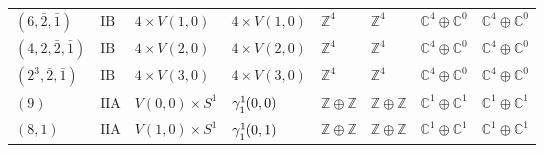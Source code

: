 \documentclass[11pt,a4paper]{article}
\def\unitbundle#1#2#3{{\gamma^1\!\!\!\strut_{#1}(#2,#3)}}
\begin{document}
\begin{appendix}
\begin{table}
\begin{tabular}{C{2.65cm}C{0.85cm}C{3.0cm}C{3.0cm}C{2.25cm}C{2.25cm}C{1.55cm}C{1.55cm}}
\((6, \bar{2}, \bar{1})\) & \(\mathrm{IB}\) & \(4 \times V(1,0)\) & \(4 \times V(1,0)\) & \(\mathbb{Z}^{4}\) & \(\mathbb{Z}^{4}\) & \(\mathbb{C}^{4} \oplus \mathbb{C}^{0}\) & \(\mathbb{C}^{4} \oplus \mathbb{C}^{0}\) \\
\((4, 2, \bar{2}, \bar{1})\) & \(\mathrm{IB}\) & \(4 \times V(2,0)\) & \(4 \times V(2,0)\) & \(\mathbb{Z}^{4}\) & \(\mathbb{Z}^{4}\) & \(\mathbb{C}^{4} \oplus \mathbb{C}^{0}\) & \(\mathbb{C}^{4} \oplus \mathbb{C}^{0}\) \\
\((2^{3}, \bar{2}, \bar{1})\) & \(\mathrm{IB}\) & \(4 \times V(3,0)\) & \(4 \times V(3,0)\) & \(\mathbb{Z}^{4}\) & \(\mathbb{Z}^{4}\) & \(\mathbb{C}^{4} \oplus \mathbb{C}^{0}\) & \(\mathbb{C}^{4} \oplus \mathbb{C}^{0}\) \\
\((9)\) & \(\mathrm{IIA}\) & \(V(0,0) \times S^{1}\) & \(\unitbundle{1}{0}{0}\) & \(\mathbb{Z} \oplus \mathbb{Z}\) & \(\mathbb{Z} \oplus \mathbb{Z}\) & \(\mathbb{C}^{1} \oplus \mathbb{C}^{1}\) & \(\mathbb{C}^{1} \oplus \mathbb{C}^{1}\) \\
\((8, 1)\) & \(\mathrm{IIA}\) & \(V(1,0) \times S^{1}\) & \(\unitbundle{1}{0}{1}\) & \(\mathbb{Z} \oplus \mathbb{Z}\) & \(\mathbb{Z} \oplus \mathbb{Z}\) & \(\mathbb{C}^{1} \oplus \mathbb{C}^{1}\) & \(\mathbb{C}^{1} \oplus \mathbb{C}^{1}\) \\
\bottomrule
\end{tabular}
\end{table}




\end{appendix}
\end{document}
